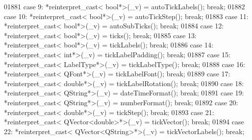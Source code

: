 \begin{DoxyCode}
01881         \textcolor{keywordflow}{case} 9: *\textcolor{keyword}{reinterpret\_cast<} \textcolor{keywordtype}{bool}*\textcolor{keyword}{>}(\_v) = autoTickLabels(); \textcolor{keywordflow}{break};
01882         \textcolor{keywordflow}{case} 10: *\textcolor{keyword}{reinterpret\_cast<} \textcolor{keywordtype}{bool}*\textcolor{keyword}{>}(\_v) = autoTickStep(); \textcolor{keywordflow}{break};
01883         \textcolor{keywordflow}{case} 11: *\textcolor{keyword}{reinterpret\_cast<} \textcolor{keywordtype}{bool}*\textcolor{keyword}{>}(\_v) = autoSubTicks(); \textcolor{keywordflow}{break};
01884         \textcolor{keywordflow}{case} 12: *\textcolor{keyword}{reinterpret\_cast<} \textcolor{keywordtype}{bool}*\textcolor{keyword}{>}(\_v) = ticks(); \textcolor{keywordflow}{break};
01885         \textcolor{keywordflow}{case} 13: *\textcolor{keyword}{reinterpret\_cast<} \textcolor{keywordtype}{bool}*\textcolor{keyword}{>}(\_v) = tickLabels(); \textcolor{keywordflow}{break};
01886         \textcolor{keywordflow}{case} 14: *\textcolor{keyword}{reinterpret\_cast<} \textcolor{keywordtype}{int}*\textcolor{keyword}{>}(\_v) = tickLabelPadding(); \textcolor{keywordflow}{break};
01887         \textcolor{keywordflow}{case} 15: *\textcolor{keyword}{reinterpret\_cast<} LabelType*\textcolor{keyword}{>}(\_v) = tickLabelType(); \textcolor{keywordflow}{break};
01888         \textcolor{keywordflow}{case} 16: *\textcolor{keyword}{reinterpret\_cast<} QFont*\textcolor{keyword}{>}(\_v) = tickLabelFont(); \textcolor{keywordflow}{break};
01889         \textcolor{keywordflow}{case} 17: *\textcolor{keyword}{reinterpret\_cast<} \textcolor{keywordtype}{double}*\textcolor{keyword}{>}(\_v) = tickLabelRotation(); \textcolor{keywordflow}{break};
01890         \textcolor{keywordflow}{case} 18: *\textcolor{keyword}{reinterpret\_cast<} QString*\textcolor{keyword}{>}(\_v) = dateTimeFormat(); \textcolor{keywordflow}{break};
01891         \textcolor{keywordflow}{case} 19: *\textcolor{keyword}{reinterpret\_cast<} QString*\textcolor{keyword}{>}(\_v) = numberFormat(); \textcolor{keywordflow}{break};
01892         \textcolor{keywordflow}{case} 20: *\textcolor{keyword}{reinterpret\_cast<} \textcolor{keywordtype}{double}*\textcolor{keyword}{>}(\_v) = tickStep(); \textcolor{keywordflow}{break};
01893         \textcolor{keywordflow}{case} 21: *\textcolor{keyword}{reinterpret\_cast<} QVector<double>*\textcolor{keyword}{>}(\_v) = tickVector(); \textcolor{keywordflow}{break};
01894         \textcolor{keywordflow}{case} 22: *\textcolor{keyword}{reinterpret\_cast<} QVector<QString>*\textcolor{keyword}{>}(\_v) = tickVectorLabels(); \textcolor{keywordflow}{break};

\end{DoxyCode}
